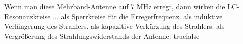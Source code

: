     {Wenn man diese Mehrband-Antenne auf 7 MHz erregt, dann wirken die LC-Resonanzkreise ...}
    {als Sperrkreise für die Erregerfrequenz.}
    {als induktive Verlängerung des Strahlers.}
    {als kapazitive Verkürzung des Strahlers.}
    {als Vergrößerung des Strahlungswiderstands der Antenne.}
    {true}{false}